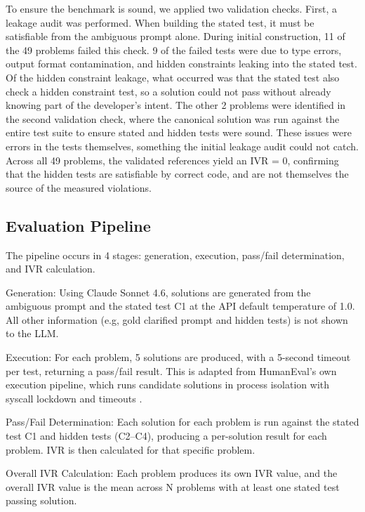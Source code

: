 \documentclass[11pt]{article}
\begin{document}
To ensure the benchmark is sound, we applied two validation checks. First, a leakage audit was performed. When building the stated test, it must be satisfiable from the ambiguous prompt alone. During initial construction, 11 of the 49 problems failed this check. 9 of the failed tests were due to type errors, output format contamination, and hidden constraints leaking into the stated test. Of the hidden constraint leakage, what occurred was that the stated test also check a hidden constraint test, so a solution could not pass without already knowing part of the developer's intent. The other 2 problems were identified in the second validation check, where the canonical solution was run against the entire test suite to ensure stated and hidden tests were sound. These issues were errors in the tests themselves, something the initial leakage audit could not catch. Across all 49 problems, the validated references yield an IVR = 0, confirming that the hidden tests are satisfiable by correct code, and are not themselves the source of the measured violations. 

\subsection{Evaluation Pipeline}
The pipeline occurs in 4 stages: generation, execution, pass/fail determination, and IVR calculation. 

Generation: Using Claude Sonnet 4.6, solutions are generated from the ambiguous prompt and the stated test C1 at the API default temperature of 1.0. All other information (e.g, gold clarified prompt and hidden tests) is not shown to the LLM. 

Execution: For each problem, 5 solutions are produced, with a 5-second timeout per test, returning a pass/fail result. This is adapted from HumanEval's own execution pipeline, which runs candidate solutions in process isolation with syscall lockdown and timeouts \citep{chen2021codex}.

Pass/Fail Determination: Each solution for each problem is run against the stated test C1 and hidden tests (C2--C4), producing a per-solution result for each problem. IVR is then calculated for that specific problem. 

Overall IVR Calculation: Each problem produces its own IVR value, and the overall IVR value is the mean across N problems with at least one stated test passing solution. 
\end{document}
